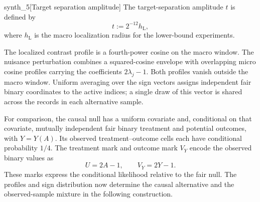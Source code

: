 \begin{definitionv}{synth_5}[Target separation amplitude]
The target-separation amplitude \(t\) is defined by
\[
t := 2^{-12}h_{\mathrm L},
\]
where \(h_{\mathrm L}\) is the macro localization radius for the lower-bound experiments.
\end{definitionv}

The localized contrast profile  is a fourth-power cosine on the macro window. The nuisance perturbation  combines a squared-cosine envelope with overlapping micro cosine profiles carrying the coefficients \(2\lambda_j-1\). Both profiles vanish outside the macro window. Uniform averaging over the sign vectors assigns independent fair binary coordinates to the active indices; a single draw of this vector is shared across the records in each alternative sample.

For comparison, the causal null  has a uniform covariate and, conditional on that covariate, mutually independent fair binary treatment and potential outcomes, with \(Y=Y(A)\). Its observed treatment--outcome cells each have conditional probability \(1/4\). The treatment mark  and outcome mark \(V_Y\) encode the observed binary values as
\[
U=2A-1,\qquad V_Y=2Y-1.
\]
These marks express the conditional likelihood relative to the fair null. The profiles and sign distribution now determine the causal alternative  and the observed-sample mixture  in the following construction.

